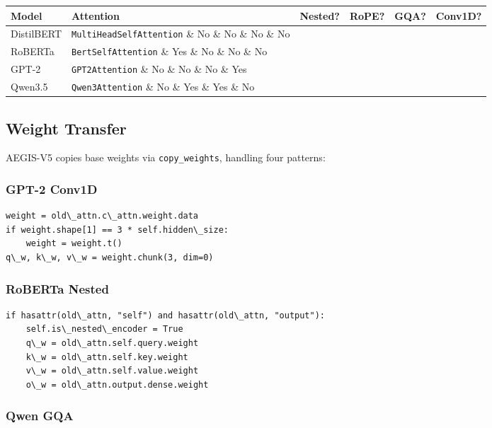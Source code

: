 \begin{table}[H]
\centering
\small
\begin{tabular}{llllll}
\toprule
\textbf{Model} & \textbf{Attention} & \textbf{Nested?} & \textbf{RoPE?} & \textbf{GQA?} & \textbf{Conv1D?} \\
\midrule
DistilBERT & \texttt{MultiHeadSelfAttention} \& No \& No \& No \& No \\
RoBERTa & \texttt{BertSelfAttention} \& Yes \& No \& No \& No \\
GPT-2 & \texttt{GPT2Attention} \& No \& No \& No \& Yes \\
Qwen3.5 & \texttt{Qwen3Attention} \& No \& Yes \& Yes \& No \\
\bottomrule
\end{tabular}
\end{table}

\subsection{Weight Transfer}

AEGIS-V5 copies base weights via \texttt{copy\_weights}, handling four patterns:

\subsubsection{GPT-2 Conv1D}

\begin{lstlisting}
weight = old\_attn.c\_attn.weight.data
if weight.shape[1] == 3 * self.hidden\_size:
    weight = weight.t()
q\_w, k\_w, v\_w = weight.chunk(3, dim=0)
\end{lstlisting}

\subsubsection{RoBERTa Nested}

\begin{lstlisting}
if hasattr(old\_attn, "self") and hasattr(old\_attn, "output"):
    self.is\_nested\_encoder = True
    q\_w = old\_attn.self.query.weight
    k\_w = old\_attn.self.key.weight
    v\_w = old\_attn.self.value.weight
    o\_w = old\_attn.output.dense.weight
\end{lstlisting}

\subsubsection{Qwen GQA}

